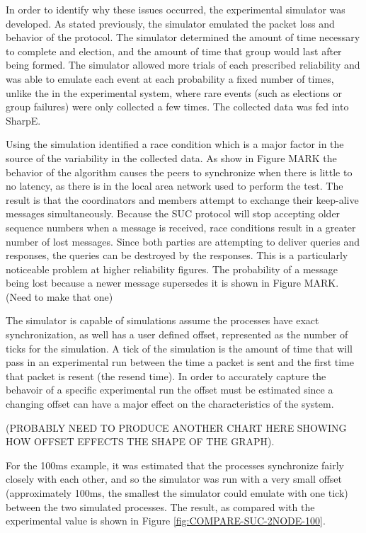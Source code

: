 In order to identify why these issues occurred, the experimental simulator was
developed. As stated previously, the simulator emulated the packet loss and
behavior of the protocol. The simulator determined the amount of time necessary
to complete and election, and the amount of time that group would last after
being formed. The simulator allowed more trials of each prescribed reliability
and was able to emulate each event at each probability a fixed number of times,
unlike the in the experimental system, where rare events (such as elections
or group failures) were only collected a few times. The collected data was fed
into SharpE.

Using the simulation identified a race condition which is a major factor in the
source of the variability in the collected data. As show in Figure MARK the 
behavior of the algorithm causes the peers to synchronize when there is little
to no latency, as there is in the local area network used to perform the test.
The result is that the coordinators and members attempt to exchange their
keep-alive messages simultaneously. Because the SUC protocol will stop accepting
older sequence numbers when a message is received, race conditions result in
a greater number of lost messages. Since both parties are attempting to
deliver queries and responses, the queries can be destroyed by the responses.
This is a particularly noticeable problem at higher reliability figures. The
probability of a message being lost because a newer message supersedes it
is shown in Figure MARK. (Need to make that one)

The simulator is capable of simulations assume the processes have exact
synchronization, as well has a user defined offset, represented as the number
of ticks for the simulation. A tick of the simulation is the amount of time
that will pass in an experimental run between the time a packet is sent and
the first time that packet is resent (the resend time). In order to accurately
capture the behavoir of a specific experimental run the offset must be estimated
since a changing offset can have a major effect on the characteristics of the
system.

(PROBABLY NEED TO PRODUCE ANOTHER CHART HERE SHOWING HOW OFFSET EFFECTS THE SHAPE OF THE GRAPH).

For the 100ms example, it was estimated that the processes synchronize fairly
closely with each other, and so the simulator was run with a very small offset (approximately 100ms, the smallest the simulator could emulate with one tick)
between the two simulated processes. The result, as compared with the
experimental value is shown in Figure \ref{fig:COMPARE-SUC-2NODE-100}.

